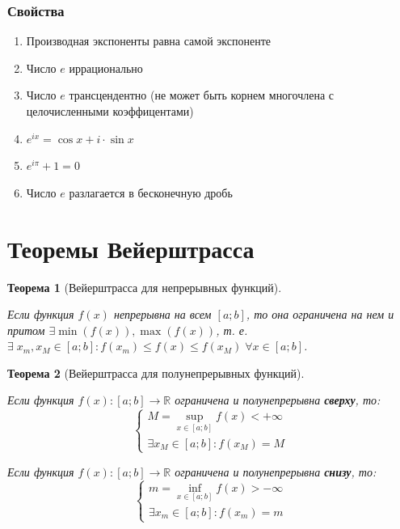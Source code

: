 \documentclass[a4paper,12pt]{extbook}
\theoremstyle{named}
\newtheorem*{theorem}{Теорема}
\theoremstyle{named}
\newcommand{\newpar}{$ $\par\nobreak\ignorespaces}
\begin{document}
\subsubsection*{Свойства}
\begin{enumerate}
    \item {Производная экспоненты равна самой экспоненте}
    \item {Число \(e\) иррационально}
    \item {Число \(e\) трансцендентно (не может быть корнем многочлена с целочисленными коэффицентами)}
    \item {\(e^{ix} = \cos{x} + i \cdot \sin{x}\)}
    \item {\(e^{i\pi} + 1 = 0\)}
    \item {Число \(e\) разлагается в бесконечную дробь}
\end{enumerate}



\section{Теоремы Вейерштрасса}%
\label{sec:Теоремы Вейерштрасса}

\begin{theorem}[Вейерштрасса для непрерывных функций]
    \newpar
    Если функция \(f(x)\) непрерывна на всем \([a; b]\), то она ограничена на нем и притом \(\exists \min{(f(x))}, \max{(f(x))}\), т. е. \(\exists \; x_m, x_M \in [a; b]: f(x_m) \leq f(x) \leq f(x_M) \; \forall x \in [a; b]\).
\end{theorem}

\begin{theorem}[Вейерштрасса для полунепрерывных функций]
    \newpar
    Если функция \(f(x): [a; b] \to \mathbb{R}\) ограничена и полунепрерывна \textbf{сверху}, то:
    \[
        \begin{cases}
            M = \underset{x \in [a; b]}{\sup}f(x) < +\infty \\
            \exists x_M \in [a; b]: f(x_M) = M
        \end{cases}
    \]

    Если функция \(f(x): [a; b] \to \mathbb{R}\) ограничена и полунепрерывна \textbf{снизу}, то:
    \[
        \begin{cases}
            m = \underset{x \in [a; b]}{\inf}f(x) > -\infty \\
            \exists x_m \in [a; b]: f(x_m) = m
        \end{cases}
    \]
\end{theorem}
\end{document}
